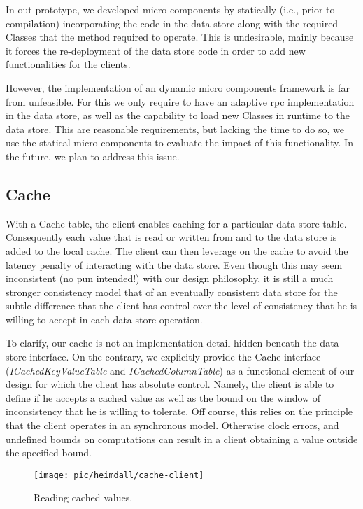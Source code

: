 In out prototype, we  developed micro components by statically (i.e., prior to compilation) incorporating the code in the data store along with the required Classes that the method required to operate. 
This is undesirable, mainly because it forces the re-deployment of the data store code in order to add new functionalities for the clients. 

However, the implementation of an dynamic micro components framework is far from unfeasible.
For this we only require to have an adaptive \gls{rpc} implementation in the data store, as well as the capability to load new Classes in runtime to the data store. 
This are reasonable requirements, but lacking the time to do so, we use the statical micro components to evaluate the impact of this functionality. 
In the future, we plan to address this issue. 


\subsection{Cache}
\label{sec:heimdall:cache}

With a Cache table, the client enables caching for a particular data store table. 
Consequently each value that is read or written from and to the data store is added to the local cache. 
The client can then leverage on the cache to avoid the latency penalty of interacting with  the data store. 
Even though this may seem inconsistent (no pun intended!)  with our design philosophy, it is still a much stronger consistency model that of an eventually consistent data store for the subtle  difference that the client has control over the level of consistency that he is willing to accept in each data store operation. 

To clarify, our cache is not an implementation detail hidden beneath the data store interface. 
On the contrary, we explicitly provide the Cache interface (\emph{ICachedKeyValueTable} and \emph{ICachedColumnTable}) as a functional element of our design for which the client has absolute control. 
Namely, the client is able to define if he accepts a cached value as well as the bound on the  window of inconsistency that he is willing to tolerate. 
Off course, this relies on the principle that the client operates in an synchronous model. 
Otherwise clock errors, and undefined bounds on computations can result in a client obtaining a value outside the specified bound. 

\begin{figure}[ht]
  \centering
  \texttt{[image: pic/heimdall/cache-client]}
  \caption{Reading cached values.}
  \label{fig:cache-client}
\end{figure}

